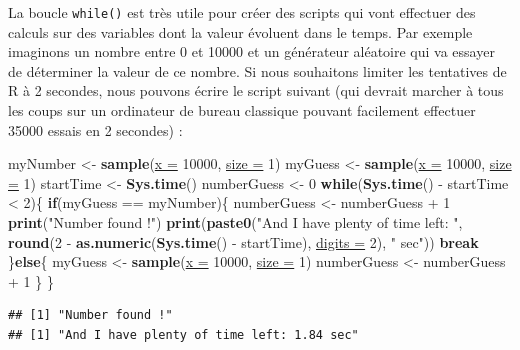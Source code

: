\documentclass[twoside,symmetric]{book}
\newenvironment{Shaded}{}{}
\newcommand{\ControlFlowTok}[1]{\textbf{#1}}
\newcommand{\DataTypeTok}[1]{\underline{#1}}
\newcommand{\DecValTok}[1]{#1}
\newcommand{\KeywordTok}[1]{\textbf{#1}}
\newcommand{\NormalTok}[1]{#1}
\newcommand{\OperatorTok}[1]{#1}
\newcommand{\StringTok}[1]{#1}
\begin{document}
La boucle \texttt{while()} est très utile pour créer des scripts qui vont effectuer des calculs sur des variables dont la valeur évoluent dans le temps. Par exemple imaginons un nombre entre 0 et 10000 et un générateur aléatoire qui va essayer de déterminer la valeur de ce nombre. Si nous souhaitons limiter les tentatives de R à 2 secondes, nous pouvons écrire le script suivant (qui devrait marcher à tous les coups sur un ordinateur de bureau classique pouvant facilement effectuer 35000 essais en 2 secondes) :

\begin{Shaded}
\begin{Highlighting}[]
\NormalTok{myNumber <-}\StringTok{ }\KeywordTok{sample}\NormalTok{(}\DataTypeTok{x =} \DecValTok{10000}\NormalTok{, }\DataTypeTok{size =} \DecValTok{1}\NormalTok{)}
\NormalTok{myGuess <-}\StringTok{ }\KeywordTok{sample}\NormalTok{(}\DataTypeTok{x =} \DecValTok{10000}\NormalTok{, }\DataTypeTok{size =} \DecValTok{1}\NormalTok{)}
\NormalTok{startTime <-}\StringTok{ }\KeywordTok{Sys.time}\NormalTok{()}
\NormalTok{numberGuess <-}\StringTok{ }\DecValTok{0}
\ControlFlowTok{while}\NormalTok{(}\KeywordTok{Sys.time}\NormalTok{() }\OperatorTok{-}\StringTok{ }\NormalTok{startTime }\OperatorTok{<}\StringTok{ }\DecValTok{2}\NormalTok{)\{}
  \ControlFlowTok{if}\NormalTok{(myGuess }\OperatorTok{==}\StringTok{ }\NormalTok{myNumber)\{}
\NormalTok{    numberGuess <-}\StringTok{ }\NormalTok{numberGuess }\OperatorTok{+}\StringTok{ }\DecValTok{1}
    \KeywordTok{print}\NormalTok{(}\StringTok{"Number found !"}\NormalTok{)}
    \KeywordTok{print}\NormalTok{(}\KeywordTok{paste0}\NormalTok{(}\StringTok{"And I have plenty of time left: "}\NormalTok{, }
      \KeywordTok{round}\NormalTok{(}\DecValTok{2} \OperatorTok{-}\StringTok{ }\KeywordTok{as.numeric}\NormalTok{(}\KeywordTok{Sys.time}\NormalTok{() }\OperatorTok{-}\StringTok{ }\NormalTok{startTime), }\DataTypeTok{digits =} \DecValTok{2}\NormalTok{), }
      \StringTok{" sec"}\NormalTok{))}
    \ControlFlowTok{break}
\NormalTok{  \}}\ControlFlowTok{else}\NormalTok{\{}
\NormalTok{    myGuess <-}\StringTok{ }\KeywordTok{sample}\NormalTok{(}\DataTypeTok{x =} \DecValTok{10000}\NormalTok{, }\DataTypeTok{size =} \DecValTok{1}\NormalTok{)}
\NormalTok{    numberGuess <-}\StringTok{ }\NormalTok{numberGuess }\OperatorTok{+}\StringTok{ }\DecValTok{1}
\NormalTok{  \}}
\NormalTok{\}}
\end{Highlighting}
\end{Shaded}

\begin{verbatim}
## [1] "Number found !"
## [1] "And I have plenty of time left: 1.84 sec"
\end{verbatim}
\end{document}
